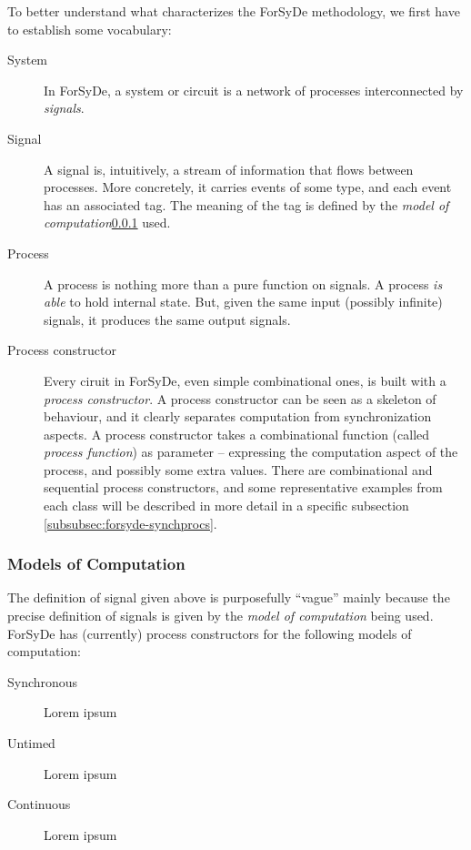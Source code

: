 \documentclass[a4paper]{article}
\begin{document}
            To better understand what characterizes the ForSyDe methodology, we first have to
            establish some vocabulary:
            \begin{description}
                \item[System] In ForSyDe, a system or circuit is a network of processes
                    interconnected by \emph{signals}.
                \item[Signal] A signal is, intuitively, a stream of information that flows between
                    processes. More concretely, it carries events of some type, and each event has
                    an associated tag. The meaning of the tag is defined by the \emph{model of
                    computation}\ref{subsubsec:forsyde-mocs} used.
                \item[Process] A process is nothing more than a pure function on signals. A process
                    \emph{is able} to hold internal state. But, given the same input (possibly
                    infinite) signals, it produces the same output signals.
                \item[Process constructor] Every ciruit in ForSyDe, even simple combinational ones,
                    is built with a \emph{process constructor}. A process constructor can be seen as
                    a skeleton of behaviour, and it clearly separates computation from
                    synchronization aspects. A process constructor takes a combinational function
                    (called \emph{process function}) as parameter -- expressing the computation
                    aspect of the process, and possibly some extra values. There are combinational
                    and sequential process constructors, and some representative examples from each
                    class will be described in more detail in a specific subsection
                    \ref{subsubsec:forsyde-synchprocs}.
            \end{description}

            \subsubsection{Models of Computation}
            \label{subsubsec:forsyde-mocs}
                The definition of signal given above is purposefully ``vague'' mainly because the
                precise definition of signals is given by the \emph{model of computation} being
                used. ForSyDe has (currently) process constructors for the following models of
                computation:
                \begin{description}
                    \item[Synchronous] Lorem ipsum  %
                    \item[Untimed] Lorem ipsum
                    \item[Continuous] Lorem ipsum
                \end{description}
\end{document}
